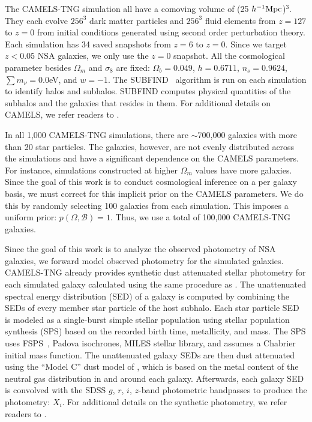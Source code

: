 The CAMELS-TNG simulation all have a comoving volume of 
(25 $h^{-1}{\rm Mpc}$)$^3$.
They each evolve $256^3$ dark matter particles and $256^3$ fluid elements from
$z=127$ to $z=0$ from initial conditions generated using second order
perturbation theory. 
Each simulation has 34 saved snapshots from $z=6$ to $z=0$. 
Since we target $z < 0.05$ NSA galaxies, we only use the $z=0$ snapshot. 
All the cosmological parameter besides $\Omega_m$ and $\sigma_8$ are fixed:
$\Omega_b = 0.049$, $h = 0.6711$, $n_s = 0.9624$, $\sum m_\nu = 0.0$eV, and 
$w = -1$.
The SUBFIND~\citep{springel2001, dolag2009} algorithm is run on each simulation
to identify halos and subhalos.
SUBFIND computes physical quantities of the subhalos and the galaxies that
resides in them. 
For additional details on CAMELS, we refer readers to
\cite{villaescusa-navarro2021, villaescusa-navarro2022a}.

In all 1,000 CAMELS-TNG simulations, there are $\sim$700,000 galaxies with more
than 20 star particles. 
The galaxies, however, are not evenly distributed across the simulations and
have a significant dependence on the CAMELS parameters.  
For instance, simulations constructed at higher $\Omega_m$ values have more
galaxies.  
Since the goal of this work is to conduct cosmological inference on a per
galaxy basis, we must correct for this implicit prior on the CAMELS parameters.
We do this by randomly selecting 100 galaxies from each simulation. 
This imposes a uniform prior: $p(\Omega, \mathcal{B}) = 1$. 
Thus, we use a total of 100,000 CAMELS-TNG galaxies.  

Since the goal of this work is to analyze the observed photometry of NSA
galaxies, we forward model observed photometry for the simulated galaxies. 
CAMELS-TNG already provides synthetic dust attenuated stellar photometry for
each simulated galaxy calculated using the same procedure as \cite{nelson2018}.
The unattenuated spectral energy distribution (SED) of a galaxy is computed by
combining the SEDs of every member star particle of the host subhalo. 
Each star particle SED is modeled as a single-burst simple stellar population
using stellar population synthesis (SPS) based on the recorded birth time,
metallicity, and mass. 
The SPS uses FSPS~\citep{conroy2009, conroy2010}, Padova isochrones, MILES
stellar library, and assumes a Chabrier initial mass function. 
The unattenuated galaxy SEDs are then dust attenuated using the ``Model C'' dust
model of \cite{nelson2018}, which is based on the metal content of the neutral
gas distribution in and around each galaxy. 
Afterwards, each galaxy SED is convolved with the SDSS $g$, $r$, $i$, $z$-band
photometric bandpasses to produce the photometry: $X_i$. 
For additional details on the synthetic photometry, we refer readers to
\cite{nelson2018}. 

